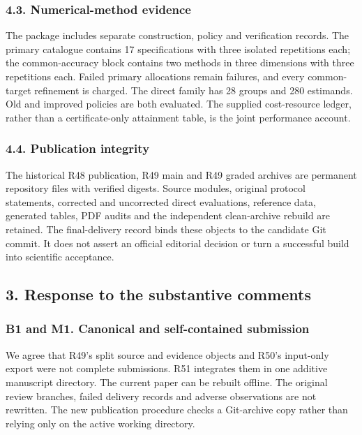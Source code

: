 \hypertarget{numerical-method-evidence}{%
\subsubsection{4.3. Numerical-method
evidence}\label{numerical-method-evidence}}

The package includes separate construction, policy and verification
records. The primary catalogue contains 17 specifications with three
isolated repetitions each; the common-accuracy block contains two
methods in three dimensions with three repetitions each. Failed primary
allocations remain failures, and every common-target refinement is
charged. The direct family has 28 groups and 280 estimands. Old and
improved policies are both evaluated. The supplied cost-resource ledger,
rather than a certificate-only attainment table, is the joint
performance account.

\hypertarget{publication-integrity}{%
\subsubsection{4.4. Publication integrity}\label{publication-integrity}}

The historical R48 publication, R49 main and R49 graded archives are
permanent repository files with verified digests. Source modules,
original protocol statements, corrected and uncorrected direct
evaluations, reference data, generated tables, PDF audits and the
independent clean-archive rebuild are retained. The final-delivery
record binds these objects to the candidate Git commit. It does not
assert an official editorial decision or turn a successful build into
scientific acceptance.

\hypertarget{response-to-the-substantive-comments}{%
\subsection{3. Response to the substantive
comments}\label{response-to-the-substantive-comments}}

\hypertarget{b1-and-m1.-canonical-and-self-contained-submission}{%
\subsubsection{B1 and M1. Canonical and self-contained
submission}\label{b1-and-m1.-canonical-and-self-contained-submission}}

We agree that R49's split source and evidence objects and R50's
input-only export were not complete submissions. R51 integrates them in
one additive manuscript directory. The current paper can be rebuilt
offline. The original review branches, failed delivery records and
adverse observations are not rewritten. The new publication procedure
checks a Git-archive copy rather than relying only on the active working
directory.

